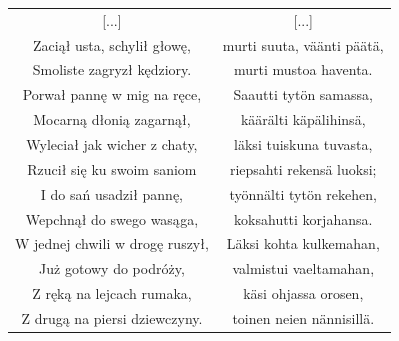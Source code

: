 \documentclass[11pt,a4paper,twoside]{report}
\begin{document}
{\centering
\small
\begin{longtable}{c c}
{[...]} & {[...]} \\
Zaciął usta, schylił głowę, & murti suuta, väänti päätä, \\
Smoliste zagryzł kędziory. & murti mustoa haventa. \\
Porwał pannę w mig na ręce, & Saautti tytön samassa, \\
Mocarną dłonią zagarnął, & käärälti käpälihinsä, \\
Wyleciał jak wicher z chaty, & läksi tuiskuna tuvasta, \\
Rzucił się ku swoim saniom & riepsahti rekensä luoksi; \\ \newpage
I do sań usadził pannę, & työnnälti tytön rekehen, \\
Wepchnął do swego wasąga, & koksahutti korjahansa. \\
W jednej chwili w drogę ruszył, & Läksi kohta kulkemahan, \\
Już gotowy do podróży, & valmistui vaeltamahan, \\
Z ręką na lejcach rumaka, & käsi ohjassa orosen, \\
Z drugą na piersi dziewczyny. & toinen neien nännisillä. \\
\end{longtable}
}
\vspace*{0.5\baselineskip}
\end{document}
